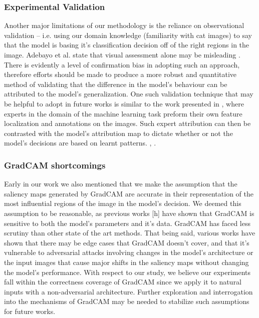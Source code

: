 \documentclass[conference]{IEEEtran}
\begin{document}
\subsubsection{Experimental Validation}
Another major limitations of our methodology is the reliance on observational validation – i.e. using our domain knowledge (familiarity with cat images) to say that the model is basing it’s classification decision off of the right regions in the image. Adebayo et al. state that visual assessment alone may be misleading \cite{sanity}. There is evidently a level of confirmation bias in adopting such an approach, therefore efforts should be made to produce a more robust and quantitative method of validating that the difference in the model’s behaviour can be attributed to the model’s generalization. One such validation technique that may be helpful to adopt in future works is similar to the work presented in \cite{rrr}, where experts in the domain of the machine learning task preform their own feature localization and annotations on the images. Such expert attribution can then be contrasted with the model’s attribution map to dictate whether or not the model’s decisions are based on learnt patterns. \cite{humanaided}, \cite{reduceoverfit}. 
 
\subsubsection{GradCAM shortcomings}
Early in our work we also mentioned that we make the assumption that the saliency maps generated by GradCAM are accurate in their representation of the most influential regions of the image in the model’s decision. We deemed this assumption to be reasonable, as previous works [h] have shown that GradCAM is sensitive to both the model’s parameters and it’s data. GradCAM has faced less scrutiny than other state of the art methods. That being said, various works have shown that there may be edge cases that GradCAM doesn’t cover, and that it’s vulnerable to adversarial attacks involving changes in the model’s architecture \cite{cnnlie} or the input images \cite{fragile} that cause major shifts in the saliency maps without changing the model’s performance. With respect to our study, we believe our experiments fall within the correctness coverage of GradCAM since we apply it to natural inputs with a non-adversarial architecture. Further exploration and interrogation into the mechanisms of GradCAM may be needed to stabilize such assumptions for future works. 
\end{document}
